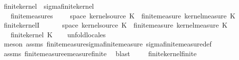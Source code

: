 \begin{isabellebody}
\isanewline
{}\isamarkupfalse%
\ finite{\isacharunderscore}{\kern0pt}kernel\ {\isacharequal}{\kern0pt}\ sigma{\isacharunderscore}{\kern0pt}finite{\isacharunderscore}{\kern0pt}kernel\ {\isacharplus}{\kern0pt}\isanewline
\ \ \ finite{\isacharunderscore}{\kern0pt}measures{\isacharcolon}{\kern0pt}\ \ {\isachardoublequoteopen}{\isasymAnd}{\isasymomega}{\isachardot}{\kern0pt}\ {\isasymomega}\ {\isasymin}\ space\ {\isacharparenleft}{\kern0pt}kernel{\isacharunderscore}{\kern0pt}source\ K{\isacharparenright}{\kern0pt}\ {\isasymLongrightarrow}\ finite{\isacharunderscore}{\kern0pt}measure\ {\isacharparenleft}{\kern0pt}kernel{\isacharunderscore}{\kern0pt}measure\ K\ {\isasymomega}{\isacharparenright}{\kern0pt}{\isachardoublequoteclose}\isanewline
\isanewline
{}\isamarkupfalse%
\ finite{\isacharunderscore}{\kern0pt}kernelI{\isacharcolon}{\kern0pt}\isanewline
\ \ \ {\isachardoublequoteopen}{\isasymAnd}{\isasymomega}{\isachardot}{\kern0pt}\ {\isasymomega}\ {\isasymin}\ space\ {\isacharparenleft}{\kern0pt}kernel{\isacharunderscore}{\kern0pt}source\ K{\isacharparenright}{\kern0pt}\ {\isasymLongrightarrow}\ finite{\isacharunderscore}{\kern0pt}measure\ {\isacharparenleft}{\kern0pt}kernel{\isacharunderscore}{\kern0pt}measure\ K\ {\isasymomega}{\isacharparenright}{\kern0pt}{\isachardoublequoteclose}\isanewline
\ \ \ {\isachardoublequoteopen}finite{\isacharunderscore}{\kern0pt}kernel\ K{\isachardoublequoteclose}\isanewline
%
\isadelimproof
\ \ %
\endisadelimproof
%
\isatagproof
{}\isamarkupfalse%
\ {\isacharparenleft}{\kern0pt}unfold{\isacharunderscore}{\kern0pt}locales{\isacharparenright}{\kern0pt}\isanewline
\ \ \ \isamarkupfalse%
\ {\isacharparenleft}{\kern0pt}meson\ assms\ finite{\isacharunderscore}{\kern0pt}measure{\isachardot}{\kern0pt}sigma{\isacharunderscore}{\kern0pt}finite{\isacharunderscore}{\kern0pt}measure\ sigma{\isacharunderscore}{\kern0pt}finite{\isacharunderscore}{\kern0pt}measure{\isacharunderscore}{\kern0pt}def{\isacharparenright}{\kern0pt}\isanewline
\ \ \ \isamarkupfalse%
\ assms\ finite{\isacharunderscore}{\kern0pt}measure{\isachardot}{\kern0pt}emeasure{\isacharunderscore}{\kern0pt}finite\ \isamarkupfalse%
\ blast\isanewline
\ \ \ \isamarkupfalse%
%
\endisatagproof
{\isafoldproof}%
%
\isadelimproof
\isanewline
%
\endisadelimproof
\isanewline
{}\isamarkupfalse%
\ finite{\isacharunderscore}{\kern0pt}kernel{\isacharunderscore}{\kern0pt}finite{\isacharcolon}{\kern0pt}\isanewline

\end{isabellebody}
